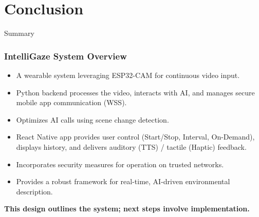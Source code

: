 \documentclass{beamer}
\begin{document}
\section{Conclusion}

\begin{frame}{Summary}
    \frametitle{IntelliGaze System Overview}
    \begin{itemize}
        \item A wearable system leveraging ESP32-CAM for continuous video input.
        \item Python backend processes the video, interacts with AI, and manages secure mobile app communication (WSS).
        \item Optimizes AI calls using scene change detection.
        \item React Native app provides user control (Start/Stop, Interval, On-Demand), displays history, and delivers auditory (TTS) / tactile (Haptic) feedback.
        \item Incorporates security measures for operation on trusted networks.
        \item Provides a robust framework for real-time, AI-driven environmental description.
    \end{itemize}
     \vspace{1em}
     \textbf{This design outlines the system; next steps involve implementation.}
\end{frame}
\end{document}
